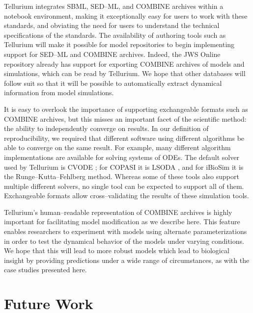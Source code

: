 \documentclass[10pt,letterpaper]{article}
\begin{document}
Tellurium integrates SBML, SED--ML, and COMBINE archives within a notebook environment, making it exceptionally easy for users to work with these standards, and obviating the need for users to understand the technical specifications of the standards. The availability of authoring tools such as Tellurium will make it possible for model repositories to begin implementing support for SED--ML and COMBINE archives. Indeed, the JWS Online repository \cite{olivier2004web} already has support for exporting COMBINE archives of models and simulations, which can be read by Tellurium. We hope that other databases will follow suit so that it will be possible to automatically extract dynamical information from model simulations.

It is easy to overlook the importance of supporting exchangeable formats such as COMBINE archives, but this misses an important facet of the scientific method: the ability to independently converge on results. In our definition of reproducibility, we required that different software using different algorithms be able to converge on the same result. For example, many different algorithm implementations are available for solving systems of ODEs. The default solver used by Tellurium is CVODE \cite{cohen1996cvode}; for COPASI it is LSODA \cite{petzold1989computing}, and for iBioSim it is the Runge–Kutta–Fehlberg method. Whereas some of these tools also support multiple different solvers, no single tool can be expected to support all of them. Exchangeable formats allow cross--validating the results of these simulation tools.


Tellurium's human--readable representation of COMBINE archives is highly important for facilitating model modification as we describe here. This feature enables researchers to experiment with models using alternate parameterizations in order to test the dynamical behavior of the models under varying conditions. We hope that this will lead to more robust models which lead to biological insight by providing predictions under a wide range of circumstances, as with the case studies presented here.

\section*{Future Work}
\end{document}
